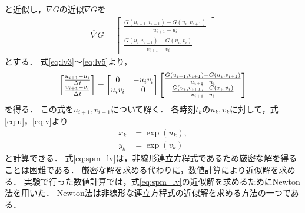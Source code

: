 と近似し，$\nabla G$の近似$\overline{\nabla}G$を
\begin{align}
    \label{eq:lv5}
    \overline{\nabla}G = 
    \begin{bmatrix}
        \frac{G(u_{i+1},v_{i+1}) - G(u_i,v_{i+1})}{u_{i+1} - u_i} \\
        \frac{G(u_{i},v_{i+1}) - G(u_i,v_i)}{v_{i+1} - v_i}
    \end{bmatrix}
\end{align}
とする．
式\eqref{eq:lv3}〜\eqref{eq:lv5}より，
\begin{align}
    \label{eq:spm_lv}
    \begin{bmatrix}
        \frac{u_{i+1} - u_i}{\Delta t} \\
         \frac{v_{i+1} - v_i}{\Delta t}
    \end{bmatrix}
    = 
    \begin{bmatrix}
        0 & -u_i v_i \\
        u_i v_i & 0
    \end{bmatrix}
    \begin{bmatrix}
        \frac{G(u_{i+1},v_{i+1}) - G(u_i,v_{i+1})}{u_{i+1} - u_i} \\
        \frac{G(u_{i},v_{i+1}) - G(x_i,v_i)}{v_{i+1} - v_i}
    \end{bmatrix}
\end{align}
を得る．
この式を$u_{i+1},v_{i+1}$について解く．
各時刻$t_{k}$の$u_{k},v_{k}$に対して，式\eqref{eq:u}，\eqref{eq:v}より
\begin{align*}
    x_k &= \exp(u_k), \\
    y_k &= \exp(v_k)
\end{align*}
と計算できる．
式\eqref{eq:spm_lv}は，非線形連立方程式であるため厳密な解を得ることは困難である．
厳密な解を求める代わりに，数値計算により近似解を求める．
実験で行った数値計算では，式\eqref{eq:spm_lv}の近似解を求めるためにNewton法を用いた．
Newton法は非線形な連立方程式の近似解を求める方法の一つである．

